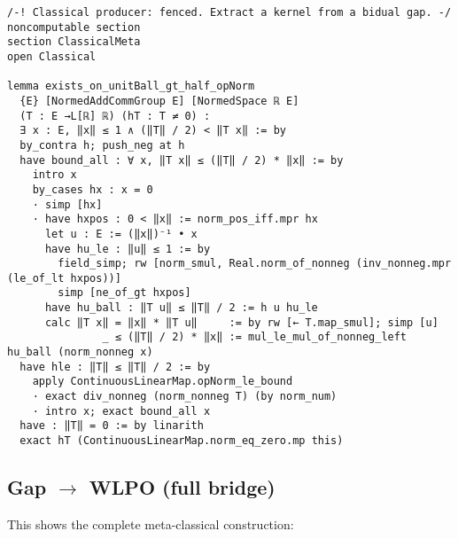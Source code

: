 \documentclass[11pt]{article}
\begin{document}
\begin{lstlisting}[caption={Classical producer: extracting kernel from gap},label={lst:producer}]
/-! Classical producer: fenced. Extract a kernel from a bidual gap. -/
noncomputable section
section ClassicalMeta
open Classical

lemma exists_on_unitBall_gt_half_opNorm
  {E} [NormedAddCommGroup E] [NormedSpace ℝ E]
  (T : E →L[ℝ] ℝ) (hT : T ≠ 0) :
  ∃ x : E, ‖x‖ ≤ 1 ∧ (‖T‖ / 2) < ‖T x‖ := by
  by_contra h; push_neg at h
  have bound_all : ∀ x, ‖T x‖ ≤ (‖T‖ / 2) * ‖x‖ := by
    intro x
    by_cases hx : x = 0
    · simp [hx]
    · have hxpos : 0 < ‖x‖ := norm_pos_iff.mpr hx
      let u : E := (‖x‖)⁻¹ • x
      have hu_le : ‖u‖ ≤ 1 := by
        field_simp; rw [norm_smul, Real.norm_of_nonneg (inv_nonneg.mpr (le_of_lt hxpos))]
        simp [ne_of_gt hxpos]
      have hu_ball : ‖T u‖ ≤ ‖T‖ / 2 := h u hu_le
      calc ‖T x‖ = ‖x‖ * ‖T u‖     := by rw [← T.map_smul]; simp [u]
               _ ≤ (‖T‖ / 2) * ‖x‖ := mul_le_mul_of_nonneg_left hu_ball (norm_nonneg x)
  have hle : ‖T‖ ≤ ‖T‖ / 2 := by
    apply ContinuousLinearMap.opNorm_le_bound
    · exact div_nonneg (norm_nonneg T) (by norm_num)
    · intro x; exact bound_all x
  have : ‖T‖ = 0 := by linarith
  exact hT (ContinuousLinearMap.norm_eq_zero.mp this)
\end{lstlisting}

\subsection{Gap $\to$ WLPO (full bridge)}

This shows the complete meta-classical construction:
\end{document}
